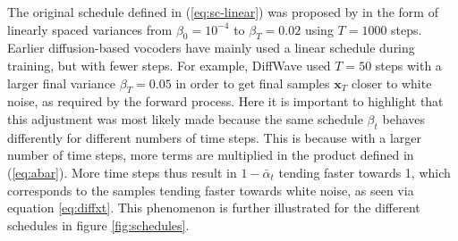 \documentclass{report}
\begin{document}
The original schedule defined in (\ref{eq:sc-linear}) was proposed by \cite{ho2020denoising} in the form of linearly spaced variances from $\beta_0 = 10^{-4}$ to $\beta_T=0.02$ using $T=1000$ steps. Earlier diffusion-based vocoders have mainly used a linear schedule during training, but with fewer steps. For example, DiffWave used $T=50$ steps with a larger final variance $\beta_T=0.05$ in order to get final samples $\bm{x}_T$ closer to white noise, as required by the forward process. Here it is important to highlight that this adjustment was most likely made because the same schedule $\beta_t$ behaves differently for different numbers of time steps. This is because with a larger number of time steps, more terms are multiplied in the product defined in (\ref{eq:abar}). More time steps thus result in $1-\bar{\alpha}_t$ tending faster towards 1, which corresponds to the samples tending faster towards white noise, as seen via equation \ref{eq:diffxt}. This phenomenon is further illustrated for the different schedules in figure \ref{fig:schedules}.
\end{document}
